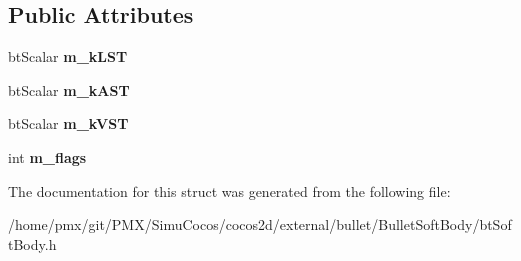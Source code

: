 \subsection*{Public Attributes}
\begin{DoxyCompactItemize}
\item 
\mbox{\label{structbtSoftBody_1_1Material_adf4cb9a81ab3ce7fdb7297fb482fd9a8}} 
bt\+Scalar {\bfseries m\+\_\+k\+L\+ST}
\item 
\mbox{\label{structbtSoftBody_1_1Material_a1875797b002c5248c90f42fbee349a43}} 
bt\+Scalar {\bfseries m\+\_\+k\+A\+ST}
\item 
\mbox{\label{structbtSoftBody_1_1Material_ab86b682fc529ec4f315dbea2f87a7b29}} 
bt\+Scalar {\bfseries m\+\_\+k\+V\+ST}
\item 
\mbox{\label{structbtSoftBody_1_1Material_a1822a2a9a82241735e84531f59dc118c}} 
int {\bfseries m\+\_\+flags}
\end{DoxyCompactItemize}


The documentation for this struct was generated from the following file\+:\begin{DoxyCompactItemize}
\item 
/home/pmx/git/\+P\+M\+X/\+Simu\+Cocos/cocos2d/external/bullet/\+Bullet\+Soft\+Body/bt\+Soft\+Body.\+h\end{DoxyCompactItemize}
